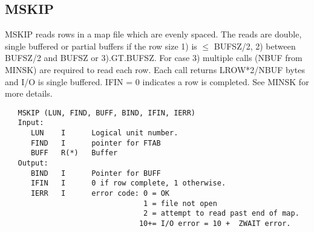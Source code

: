 \subsection{MSKIP}
MSKIP reads rows in a map file which are evenly spaced.  The reads
are double, single buffered or partial buffers if the row size
1) is $\le$ BUFSZ/2, 2) between BUFSZ/2 and BUFSZ or 3).GT.BUFSZ.
For case 3) multiple calls (NBUF from MINSK) are required to read
each row.  Each call returns LROW*2/NBUF bytes and I/O is
single buffered.  IFIN = 0 indicates a row is completed.  See
MINSK for more details.
\begin{verbatim}
   MSKIP (LUN, FIND, BUFF, BIND, IFIN, IERR)
   Input:
      LUN    I      Logical unit number.
      FIND   I      pointer for FTAB
      BUFF   R(*)   Buffer
   Output:
      BIND   I      Pointer for BUFF
      IFIN   I      0 if row complete, 1 otherwise.
      IERR   I      error code: 0 = OK
                                1 = file not open
                                2 = attempt to read past end of map.
                               10+= I/O error = 10 +  ZWAIT error.
\end{verbatim}

